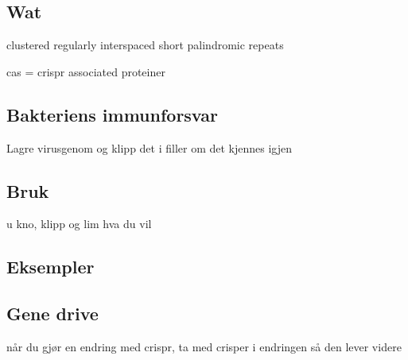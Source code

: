 \subsection{Wat}
    clustered regularly interspaced short palindromic repeats

    cas = crispr associated proteiner

\subsection{Bakteriens immunforsvar}
    Lagre virusgenom og klipp det i filler om det kjennes igjen

\subsection{Bruk}
    u kno, klipp og lim hva du vil

\subsection{Eksempler}

\subsection{Gene drive}
    når du gjør en endring med crispr, ta med crisper i endringen så den lever videre
